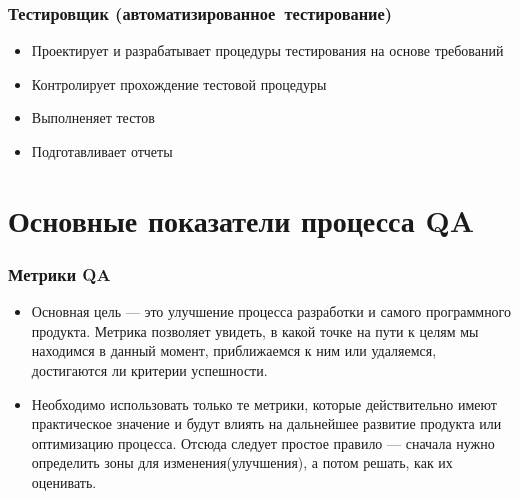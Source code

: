 \documentclass{../industrial-development}
\begin{document}
	\begin{frame} \frametitle{Тестировщик (автоматизированное~тестирование)}
		\begin{itemize}
			\item Проектирует и разрабатывает процедуры тестирования на основе требований
			\item Контролирует прохождение тестовой процедуры
			\item Выполненяет тестов
			\item Подготавливает отчеты
		\end{itemize}
	\end{frame}
	
	\section{Основные показатели процесса QA}
	\begin{frame} \frametitle{Метрики QA}
		\begin{itemize}
			\item Основная цель --- это улучшение процесса разработки и самого программного продукта. Метрика позволяет увидеть, в какой точке на пути к целям мы находимся в данный момент, приближаемся к ним или удаляемся, достигаются ли критерии успешности.
			\item Необходимо использовать только те метрики, которые действительно имеют практическое значение и будут влиять на дальнейшее развитие продукта или оптимизацию процесса. Отсюда следует простое правило --- сначала нужно определить зоны для изменения(улучшения), а потом решать, как их оценивать.
		\end{itemize}
	\end{frame}
\end{document}
